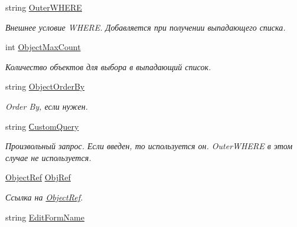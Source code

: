 \begin{DoxyCompactItemize}
string \mbox{\hyperlink{class_f_b_a_1_1_sys_d_b_edit_a8955fa6989f89930e920f1ef20146f89}{Outer\+W\+H\+E\+RE}}
\begin{DoxyCompactList}\small\item\em Внешнее условие W\+H\+E\+RE. Добавляется при получении выпадающего списка. \end{DoxyCompactList}\item 
int \mbox{\hyperlink{class_f_b_a_1_1_sys_d_b_edit_aa16f3747f60b174274e4d1cdfbbe19d9}{Object\+Max\+Count}}
\begin{DoxyCompactList}\small\item\em Количество объектов для выбора в выпадающий список. \end{DoxyCompactList}\item 
string \mbox{\hyperlink{class_f_b_a_1_1_sys_d_b_edit_a7ba43e07701e2e4624e7b462b7f50984}{Object\+Order\+By}}
\begin{DoxyCompactList}\small\item\em Order By, если нужен. \end{DoxyCompactList}\item 
string \mbox{\hyperlink{class_f_b_a_1_1_sys_d_b_edit_a1629909cf9051ebef2155968fae29dcb}{Сustom\+Query}}
\begin{DoxyCompactList}\small\item\em Произвольный запрос. Если введен, то используется он. Outer\+W\+H\+E\+RE в этом случае не используется. \end{DoxyCompactList}\item 
\mbox{\hyperlink{class_f_b_a_1_1_object_ref}{Object\+Ref}} \mbox{\hyperlink{class_f_b_a_1_1_sys_d_b_edit_a6ce47c52b2c961811b2754f31017c022}{Obj\+Ref}}
\begin{DoxyCompactList}\small\item\em Ссылка на \mbox{\hyperlink{class_f_b_a_1_1_object_ref}{Object\+Ref}}. \end{DoxyCompactList}\item 
string \mbox{\hyperlink{class_f_b_a_1_1_sys_d_b_edit_ac6c5b5a75b67271359ed817242a3567b}{Edit\+Form\+Name}}

\end{DoxyCompactItemize}
